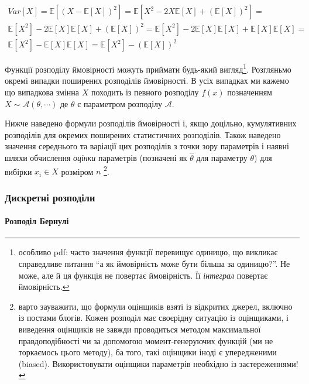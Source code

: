 \documentclass[
  11pt,
]{book}
\begin{document}
\[
\begin{aligned}
  Var[X] = \mathbb{E} \left[ (X - \mathbb{E}[X])^2 \right] = \mathbb{E} \left[ X^2 - 2X \mathbb{E} [X] + (\mathbb{E} [X])^2 \right] = \\
  \mathbb{E} [X^2] - 2 \mathbb{E}[X] \mathbb{E}[X] + (\mathbb{E}[X])^2 = \mathbb{E} [X^2] - 2 \mathbb{E}[X] \mathbb{E}[X] + \mathbb{E}[X] \mathbb{E}[X] = \\
  \mathbb{E}[X^2] - \mathbb{E}[X] \mathbb{E}[X] = \mathbb{E}[X^2] - (\mathbb{E}[X])^2
\end{aligned}
\]

Функції розподілу ймовірності можуть приймати будь-який вигляд\footnote{особливо pdf: часто значення функції перевищує одиницю, що викликає справедливе питання ``а як ймовірність може бути більша за одиницю?''. Не може, але й ця функція не повертає ймовірність. Її \emph{інтеграл} повертає ймовірність.}. Розгляньмо окремі випадки поширених розподілів ймовірності. В усіх випадках ми кажемо що випадкова змінна \(X\) походить із певного розподілу \(f(x)\) позначенням \(X \sim \mathcal{A}(\theta, \cdots)\) де \(\theta\) є параметром розподілу \(\mathcal{A}\).

Нижче наведено формули розподілів ймовірності і, якщо доцільно, кумулятивних розподілів для окремих поширених статистичних розподілів. Також наведено значення середнього та варіації цих розподілів з точки зору параметрів і наявні шляхи обчислення \emph{оцінки} параметрів (позначені як \(\hat{\theta}\) для параметру \(\theta\)) для вибірки \(x_i \in X\) розміром \(n\) \footnote{варто зауважити, що формули оцінщиків взяті із відкритих джерел, включно із постами блогів. Кожен розподіл має своєрідну ситуацію із оцінщиками, і виведення оцінщиків не завжди проводиться методом максимальної правдоподібності чи за допомогою момент-генеруючих функцій (ми не торкаємось цього методу), ба того, такі оцінщики іноді є упередженими (biased). Використовувати оцінщики параметрів необхідно із застереженнями!}.

\subsubsection{Дискретні розподіли}\label{ux434ux438ux441ux43aux440ux435ux442ux43dux456-ux440ux43eux437ux43fux43eux434ux456ux43bux438}

\paragraph{Розподіл Бернулі}\label{ux440ux43eux437ux43fux43eux434ux456ux43b-ux431ux435ux440ux43dux443ux43bux456}
\end{document}
